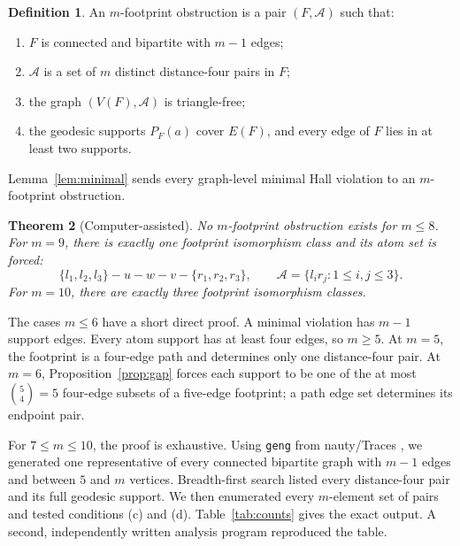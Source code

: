 \documentclass[11pt]{article}
\newtheorem{theorem}{Theorem}[section]
\theoremstyle{definition}
\newtheorem{definition}[theorem]{Definition}
\begin{document}
\begin{definition}
An \(m\)-footprint obstruction is a pair \((F,\mathcal A)\) such that:
\begin{enumerate}[label=\textup{(\alph*)}]
\item \(F\) is connected and bipartite with \(m-1\) edges;
\item \(\mathcal A\) is a set of \(m\) distinct distance-four pairs in \(F\);
\item the graph \((V(F),\mathcal A)\) is triangle-free;
\item the geodesic supports \(P_F(a)\) cover \(E(F)\), and every edge of
\(F\) lies in at least two supports.
\end{enumerate}
\end{definition}

Lemma~\ref{lem:minimal} sends every graph-level minimal Hall violation to
an \(m\)-footprint obstruction.

\begin{theorem}[Computer-assisted]\label{thm:classification}
No \(m\)-footprint obstruction exists for \(m\le8\). For \(m=9\), there
is exactly one footprint isomorphism class and its atom set is forced:
\[
 \{l_1,l_2,l_3\}-u-w-v-\{r_1,r_2,r_3\},
 \qquad
 \mathcal A=\{l_ir_j:1\le i,j\le3\}. \tag{4}
\]
For \(m=10\), there are exactly three footprint isomorphism classes.
\end{theorem}

The cases \(m\le6\) have a short direct proof. A minimal violation has
\(m-1\) support edges. Every atom support has at least four edges, so
\(m\ge5\). At \(m=5\), the footprint is a four-edge path and determines
only one distance-four pair. At \(m=6\), Proposition~\ref{prop:gap}
forces each support to be one of the at most \(\binom54=5\) four-edge
subsets of a five-edge footprint; a path edge set determines its endpoint
pair.

For \(7\le m\le10\), the proof is exhaustive. Using \texttt{geng} from
nauty/Traces \cite{McKayPiperno14}, we generated one representative of
every connected bipartite graph with \(m-1\) edges and between \(5\) and
\(m\) vertices. Breadth-first search listed every distance-four pair and
its full geodesic support. We then enumerated every \(m\)-element set of
pairs and tested conditions (c) and (d). Table~\ref{tab:counts} gives the
exact output. A second, independently written analysis program reproduced
the table.
\end{document}
